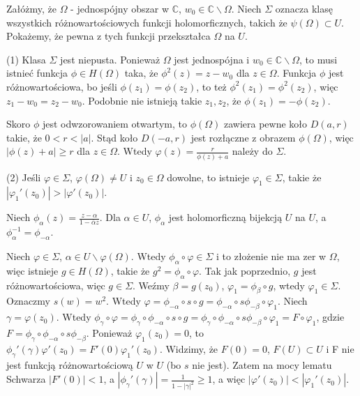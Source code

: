 \documentclass[11pt]{article}
\newcommand{\abs}[1]{\left|#1\right|} %
\newcommand{\closure}[1]{\overline{#1}} %
\theoremstyle{plain}
\theoremstyle{definition}
\theoremstyle{remark}
\let\oldendproof\endproof
\renewenvironment{proof}[1][\proofname]{
  \oldproof[\textsc{\small #1}]
}{\oldendproof}
\begin{document}
\begin{proof}
  Załóżmy, że $ \Omega $ - jednospójny obszar w $ \mathbb{C} $, $ w_0 \in \mathbb{C}\backslash\Omega $.
  Niech $ \Sigma $ oznacza klasę wszystkich różnowartościowych funkcji holomorficznych, takich że $ \psi(\Omega) \subset U $.
  Pokażemy, że pewna z tych funkcji przekształca $ \Omega $ na $ U $.

  (1) Klasa $ \Sigma $ jest niepusta.
  Ponieważ $ \Omega $ jest jednospójna i $ w_0 \in \mathbb{C}\backslash\Omega $,
  to musi istnieć funkcja $ \phi \in H(\Omega) $ taka, że $ \phi^2(z) = z - w_0 $ dla $ z \in \Omega $.
  Funkcja $ \phi $ jest różnowartościowa, bo jeśli $ \phi(z_1) = \phi(z_2) $, to też $ \phi^2(z_1) = \phi^2(z_2) $, więc $ z_1 - w_0 = z_2 - w_0 $.
  Podobnie nie istnieją takie $ z_1, z_2 $, że $ \phi(z_1) = -\phi(z_2) $.

  Skoro $ \phi $ jest odwzorowaniem otwartym, to $ \phi(\Omega) $ zawiera pewne koło $ D(a, r) $ takie, że $ 0 < r < \abs{a} $.
  Stąd koło $ D(-a, r) $ jest rozłączne z obrazem $ \phi(\Omega) $, więc $ \abs{ \phi(z) + a } \geq r $ dla $ z \in \Omega $.
  Wtedy $ \varphi(z) = \frac{r}{\phi(z) + a} $ należy do $ \Sigma $.

  (2) Jeśli $ \varphi \in \Sigma $, $ \varphi(\Omega) \neq U $ i $ z_0 \in \Omega $ dowolne,
  to istnieje $ \varphi_1 \in \Sigma $, takie że $ \abs{ \varphi_1'(z_0) } > \abs{ \varphi'(z_0) } $.


  Niech $ \phi_{\alpha}(z) = \frac{z-\alpha}{1-\closure{\alpha}z} $.
  Dla $ \alpha \in U $, $ \phi_{\alpha} $ jest holomorficzną bijekcją $ U $ na $ U $, a $ \phi_{\alpha}^{-1} = \phi_{-\alpha} $.

  Niech $ \varphi \in \Sigma $, $ \alpha \in U\backslash\varphi(\Omega) $.
  Wtedy $ \phi_{\alpha} \circ \varphi \in \Sigma $ i to złożenie nie ma zer w $ \Omega $, więc istnieje $ g \in H(\Omega) $, takie że $ g^2 = \phi_{\alpha} \circ \varphi $.
  Tak jak poprzednio, $ g $ jest różnowartościowa, więc $ g \in \Sigma $.
  Weźmy $ \beta = g(z_0) $, $ \varphi_1 = \phi_{\beta} \circ g $, wtedy $ \varphi_1 \in \Sigma $.
  Oznaczmy $ s(w) = w^2 $.
  Wtedy $ \varphi = \phi_{-\alpha} \circ s \circ g = \phi_{-\alpha} \circ s \phi_{-\beta} \circ \varphi_1 $.
  Niech $ \gamma = \varphi(z_0) $.
  Wtedy $ \phi_{\gamma} \circ \varphi = \phi_{\gamma} \circ \phi_{-\alpha} \circ s \circ g = \phi_{\gamma} \circ \phi_{-\alpha} \circ s \phi_{-\beta} \circ \varphi_1 = F \circ \varphi_1$,
  gdzie $ F = \phi_{\gamma} \circ \phi_{-\alpha} \circ s \phi_{-\beta} $.
  Ponieważ $ \varphi_1(z_0) = 0 $, to $ \phi_{\gamma}'(\gamma)\varphi'(z_0) = F'(0)\varphi_1'(z_0) $.
  Widzimy, że $ F(0) = 0 $, $ F(U) \subset U $ i F nie jest funkcją różnowartościową $ U $ w $ U $ (bo $ s $ nie jest).
  Zatem na mocy lematu Schwarza $ \abs{F'(0)} < 1 $, a $ \abs{\phi_{\gamma}'(\gamma)} = \frac{1}{1-\abs{\gamma}^2} \geq 1 $, a więc $ \abs{\varphi'(z_0)} < \abs{\varphi_1'(z_0)}$.
  

\end{proof}
\end{document}
